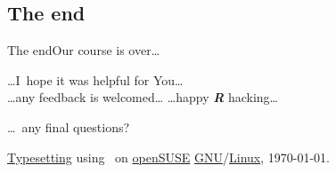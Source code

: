 \documentclass[compress, ucs, xelatex, 11pt, xcolor=svgnames,
  hyperref={
    bookmarks=true,
    unicode=true,
    colorlinks=true,
    pdftitle={Molecular data in R},
    plainpages=false,
    pdfauthor={Vojtech Zeisek},
    pdfsubject={Course about phylogeny and evolution in R},
    pdfcreator={XeLaTeX},
    pdfkeywords={R, evolution, phylogeny, molecular data},
    linkcolor=Tomato,
    anchorcolor=SaddleBrown,
    citecolor=Goldenrod,
    filecolor=DarkMagenta,
    menucolor=Sienna,
    urlcolor=DarkTurquoise,
    pdftex},
  url={hyphens, lowtilde} %
  ]{beamer}
\begin{document}
\subsection{The end}

\begin{frame}{The end}{Our course is over\ldots}
  \begin{center}
    \ldots I~hope it was helpful for You\ldots\\
    \vfill
    \ldots any feedback is welcomed\ldots
    \vfill
    \ldots happy \textbf{\textit{R}} hacking\ldots
    \vfill
  \end{center}
  \begin{flushright}
    \ldots~any final questions?
    \vfill
    \begin{tiny}
    \href{https://en.wikipedia.org/wiki/XeTeX}{Typesetting} using \XeLaTeX~on \href{https://www.opensuse.org/}{openSUSE} \href{https://en.wikipedia.org/wiki/GNU}{GNU}/\href{https://en.wikipedia.org/wiki/Linux}{Linux}, \today.
    \end{tiny}
  \end{flushright}
\end{frame}
\end{document}
